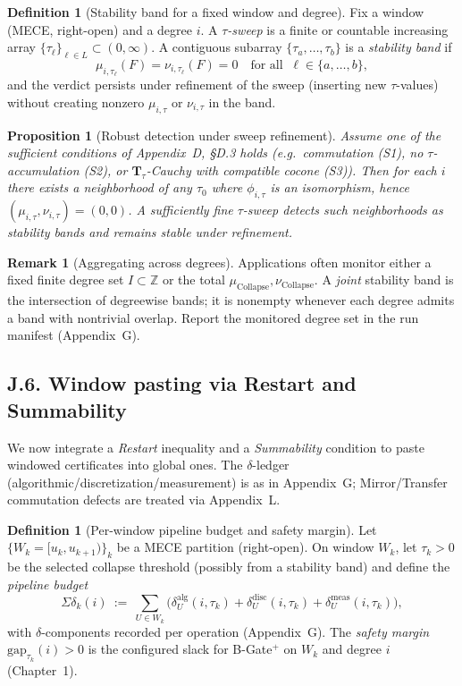 \documentclass[11pt]{article}
\numberwithin{equation}{section}
\newtheorem{proposition}[theorem]{Proposition}
\theoremstyle{definition}
\newtheorem{definition}[theorem]{Definition}
\newtheorem{remark}[theorem]{Remark}
\DeclareRobustCommand{\muc}{\mu_{\mathrm{Collapse}}}
\DeclareRobustCommand{\nuc}{\nu_{\mathrm{Collapse}}}
\begin{document}
\begin{definition}[Stability band for a fixed window and degree]\label{J:def:stab-band}
Fix a window (MECE, right-open) and a degree \(i\).
A \emph{\(\tau\)-sweep} is a finite or countable increasing array \(\{\tau_\ell\}_{\ell\in L}\subset(0,\infty)\).
A contiguous subarray \(\{\tau_a,\ldots,\tau_b\}\) is a \emph{stability band} if
\[
\mu_{i,\tau_\ell}(F)=\nu_{i,\tau_\ell}(F)=0\quad\text{for all }\ \ell\in\{a,\ldots,b\},
\]
and the verdict persists under refinement of the sweep (inserting new \(\tau\)-values) without creating nonzero \(\mu_{i,\tau}\) or \(\nu_{i,\tau}\) in the band.
\end{definition}

\begin{proposition}[Robust detection under sweep refinement]\label{J:prop:robust-band}
Assume one of the sufficient conditions of Appendix~D, §D.3 holds (e.g.\ commutation (S1), no \(\tau\)-accumulation (S2), or \(\mathbf{T}_\tau\)-Cauchy with compatible cocone (S3)). Then for each \(i\) there exists a neighborhood of any \(\tau_0\) where \(\phi_{i,\tau}\) is an isomorphism, hence \((\mu_{i,\tau},\nu_{i,\tau})=(0,0)\). A sufficiently fine \(\tau\)-sweep detects such neighborhoods as stability bands and remains stable under refinement.
\end{proposition}

\begin{remark}[Aggregating across degrees]
Applications often monitor either a fixed finite degree set \(I\subset\mathbb{Z}\) or the total \(\muc,\nuc\). A \emph{joint} stability band is the intersection of degreewise bands; it is nonempty whenever each degree admits a band with nontrivial overlap. Report the monitored degree set in the run manifest (Appendix~G).
\end{remark}

\subsection*{J.6. Window pasting via Restart and Summability}
We now integrate a \emph{Restart} inequality and a \emph{Summability} condition to paste windowed certificates into global ones. The $\delta$-ledger (algorithmic/discretization/measurement) is as in Appendix~G; Mirror/Transfer commutation defects are treated via Appendix~L.

\begin{definition}[Per-window pipeline budget and safety margin]\label{J:def:budget-gap}
Let \(\{W_k=[u_k,u_{k+1})\}_k\) be a MECE partition (right-open).
On window \(W_k\), let \(\tau_k>0\) be the selected collapse threshold (possibly from a stability band) and define the \emph{pipeline budget}
\[
\Sigma\delta_k(i)\ :=\ \sum_{U\in W_k}\Big(\delta^{\mathrm{alg}}_{U}(i,\tau_k)+\delta^{\mathrm{disc}}_{U}(i,\tau_k)+\delta^{\mathrm{meas}}_{U}(i,\tau_k)\Big),
\]
with \(\delta\)-components recorded per operation (Appendix~G). The \emph{safety margin} \(\mathrm{gap}_{\tau_k}(i)>0\) is the configured slack for B-Gate\(^{+}\) on \(W_k\) and degree \(i\) (Chapter~1).
\end{definition}
\end{document}

